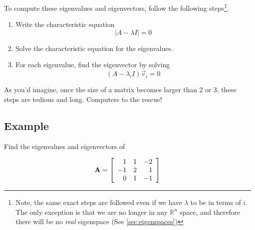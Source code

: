 To compute these eigenvalues and eigenvectors, follow the following steps\footnote{Note, the same exact steps are followed even if we have $\lambda$ to be in terms of $i$. The only exception is that we are no longer in any $\mathbb{R}^n$ space, and therefore there will be no \textit{real} eigenspace (See \eqref{sec:eigenspaces})}.

\begin{enumerate}
    \item Write the characteristic equation
        \[ \lvert A - \lambda I \rvert = 0 \]
    \item Solve the characteristic equation for the eigenvalues.
    \item For each eigenvalue, find the eigenvector by solving
        \[ \left( A - \lambda_i I \right) \vec{v}_i = 0 \]
\end{enumerate}

As you'd imagine, once the size of a matrix becomes larger than 2 or 3, these steps are tedious and long. Computers to the rescue!

    \subsection{Example}
    Find the eigenvalues and eigenvectors of

        \[ \mathbf{A} =
            \left[ \begin{array}{rrr}
                1 & 1 & -2\\
                -1 & 2 & 1\\
                0 & 1 & -1
            \end{array} \right] \]

